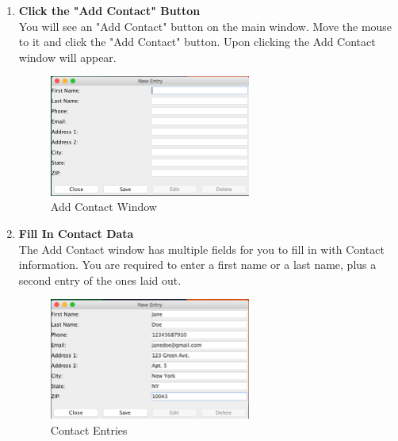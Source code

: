 \documentclass[a4paper, 11pt]{article}
\begin{document}
\begin{enumerate}[label=\textbf{\arabic*})]
    \clearpage

    \item{\textbf{Click the "Add Contact" Button}}\\ You will see an "Add Contact" button on the main window. Move the mouse to it and click the "Add Contact" button. Upon clicking the Add Contact window will appear.
    
    \begin{figure}[h!]
    \centering
      \includegraphics[width=250]{add_new_contact_window.png}
      \caption{Add Contact Window}
    \end{figure}
    
    \item{\textbf{Fill In Contact Data}}\\ The Add Contact window has multiple fields for you to fill in with Contact information. You are required to enter a first name or a last name, plus a second entry of the ones laid out.
    
    \begin{figure}[h!]
    \centering
      \includegraphics[width=250]{new_contact_entry.png}
      \caption{Contact Entries}
    \end{figure}
    

\end{enumerate}
\end{document}
